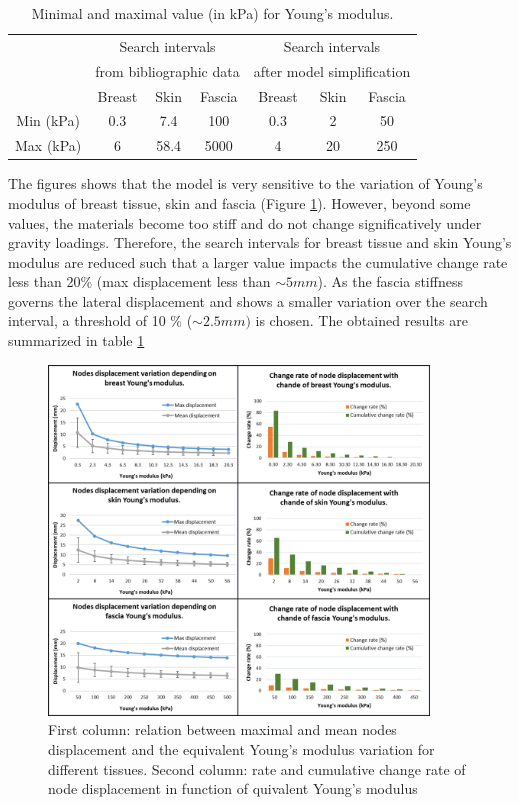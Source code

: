 \begin{table}[!h]
\centering
\begin{tabular}{|c||c|c|c||c|c|c|}
\hline
&\multicolumn{3}{|c||}{Search intervals}& \multicolumn{3}{c|}{Search intervals}\\
&\multicolumn{3}{|c||}{ from bibliographic data}& \multicolumn{3}{c|}{ after model simplification}\\
\hline
\hline
& Breast & Skin & Fascia & Breast & Skin & Fascia \\
\hline
Min (kPa)  & 0.3 & 7.4 & 100 & 0.3 & 2 & 50\\
\hline
Max (kPa) & 6 & 58.4 & 5000& 4& 20 &250 \\
\hline
\end{tabular}
\caption{Minimal and maximal value (in kPa) for Young’s modulus.}
\label{table:minandmaxelasticmodulus}
\end{table}

The figures shows that the model is very sensitive to the variation of Young’s modulus of breast tissue, skin and fascia (Figure \ref{fig:materialPropDiscretization}). However, beyond some values, the materials become too stiff and do not change significatively under gravity loadings.  Therefore, the search intervals for breast tissue and skin Young’s modulus are reduced such that a larger value impacts the cumulative change rate less than 20\% (max displacement less than $\sim 5mm$). As the fascia stiffness governs the lateral displacement and shows a smaller variation over the search interval, a threshold of 10 \% ($\sim 2.5mm)$ is chosen. The obtained results are summarized in table \ref{table:minandmaxelasticmodulus} 

\begin{figure}[!h]
\centering
\includegraphics[width=0.9\textwidth,keepaspectratio]{figures/materialPropDiscretization.png} 
\caption{First column: relation between maximal and mean nodes displacement and the equivalent Young's modulus variation for different tissues. Second column: rate and cumulative change rate of node displacement in function of quivalent Young's modulus}\label{fig:materialPropDiscretization}
\end{figure}

